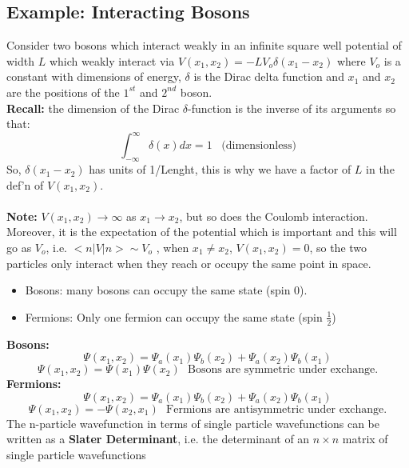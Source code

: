 \documentclass[12pt,fancychapters]{report}
\numberwithin{equation}{section}
\begin{document}
\subsection{Example: Interacting Bosons}
Consider two bosons which interact weakly in an infinite square well potential of width $L$ which 
weakly interact via $V(x_1,x_2)=-LV_o\delta(x_1 - x_2)$ where $V_o$ is a constant with dimensions 
of energy, $\delta$ is the Dirac delta function and $x_1$ and $x_2$ are the positions of the 
$1^{st}$ and $2^{nd}$ boson.\\
\textbf{Recall:} the dimension of the Dirac $\delta$-function is the inverse of its arguments so that:
\begin{equation*}
	\int_{-\infty}^{\infty} \delta(x)dx=1\,\,\,\,\,\text{(dimensionless)}
\end{equation*}
So, $\delta(x_1-x_2)$ has units of 1/Lenght, this is why we have a factor of $L$ in the def'n of 
$V(x_1, x_2)$.\\
\\
\textbf{Note:} $V(x_1,x_2)\longrightarrow \infty$ as $x_1 \longrightarrow x_2$, but so does the 
Coulomb interaction. Moreover, it is the expectation of the potential which is important and this 
will go as $V_o$, i.e. $\big<n\big|V\big|n\big>\sim V_o$ , when $x_1\neq x_2$, $V(x_1,x_2)=0$, so 
the two particles only interact when they reach or occupy the same point in space.
\begin{itemize}
	\item Bosons: many bosons can occupy the same state (spin 0).
	\item Fermions: Only one fermion can occupy the same state (spin $\frac{1}{2}$)
\end{itemize}
\textbf{Bosons:}
\begin{equation*}
	\Psi(x_1, x_2) = \Psi_a(x_1)\Psi_b(x_2) + \Psi_a(x_2)\Psi_b(x_1)
\end{equation*}
\begin{equation*}
	\Psi(x_1,x_2) = \Psi(x_1)\Psi(x_2)\,\,\,\,\text{Bosons are symmetric under exchange.}
\end{equation*}
\textbf{Fermions:}
\begin{equation*}
	\Psi(x_1, x_2) = \Psi_a(x_1)\Psi_b(x_2) + \Psi_a(x_2)\Psi_b(x_1)
\end{equation*}
\begin{equation*}
	\Psi(x_1, x_2) = -\Psi(x_2,x_1)\,\,\,\,\text{Fermions are antisymmetric under exchange.}
\end{equation*}
The n-particle wavefunction in terms of single particle wavefunctions can be written as a \textbf{
Slater Determinant}, i.e. the determinant of an $n\times n$ matrix of single particle wavefunctions
\end{document}
